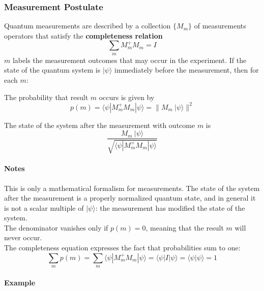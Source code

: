 \documentclass[10pt]{report}
\begin{document}
\subsubsection{Measurement Postulate}
Quantum measurements are described by a collection $\{M_m\}$ of measurements operators that satisfy the \textbf{completeness relation} $$\sum_m M_m^+ M_m = I$$
$m$ labels the measurement outcomes that may occur in the experiment. If the state of the quantum system is $|\psi\rangle$ immediately before the measurement, then for each $m$:
\begin{list}{}{}
	\item The probability that result $m$ occurs is given by $$p(m) = \langle\psi|M_m^+M_m|\psi\rangle = \|M_m\:|\psi\rangle\|^2$$
	\item The state of the system after the measurement with outcome $m$ is $$\frac{M_m\:|\psi\rangle}{\sqrt{\langle\psi|M_m^+M_m|\psi\rangle}}$$
\end{list}
\paragraph{Notes} This is only a mathematical formalism for measurements. The state of the system after the measurement is a properly normalized quantum state, and in general it is not a scalar multiple of $|\psi\rangle$: the measurement has modified the state of the system.\\
The denominator vanishes only if $p(m) = 0$, meaning that the result $m$ will never occur.\\
The completeness equation expresses the fact that probabilities sum to one: $$\sum_m p(m) = \sum_m \langle\psi|M_m^+M_m|\psi\rangle = \langle\psi|I|\psi\rangle = \langle\psi|\psi\rangle = 1$$
\paragraph{Example} %
\end{document}
